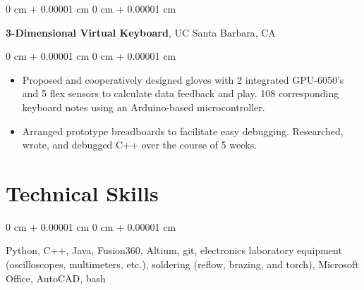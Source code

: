 \documentclass[10pt, letterpaper]{article}
\newenvironment{highlights}{
    \begin{itemize}[
        topsep=0.10 cm,
        parsep=0.10 cm,
        partopsep=0pt,
        itemsep=0pt,
        leftmargin=0 cm + 10pt
    ]
}{
    \end{itemize}
} %
\newenvironment{onecolentry}{
    \begin{adjustwidth}{
        0 cm + 0.00001 cm
    }{
        0 cm + 0.00001 cm
    }
}{
    \end{adjustwidth}
} %
\newenvironment{twocolentry}[2][]{
    \onecolentry
    \def\secondColumn{#2}
    \setcolumnwidth{\fill, 4.5 cm}
    \begin{paracol}{2}
}{
    \switchcolumn \raggedleft \secondColumn
    \end{paracol}
    \endonecolentry
} %
\begin{document}
        
        \begin{twocolentry}{
    
        }
            \textbf{3-Dimensional Virtual Keyboard}, UC Santa Barbara, CA\end{twocolentry}

        \vspace{0.10 cm}
        \begin{onecolentry}
            \begin{highlights}
                \item Proposed and cooperatively designed gloves with 2 integrated GPU-6050's and 5 flex sensors to calculate data feedback and play.
                108 corresponding keyboard notes using an Arduino-based microcontroller.
                \item Arranged prototype breadboards to facilitate easy debugging. Researched, wrote, and debugged C++ over the
                course of 5 weeks.
            \end{highlights}
        \end{onecolentry}
    
    \section{Technical Skills}

        \begin{onecolentry}
            \item Python, C++, Java, Fusion360, Altium, git, electronics laboratory equipment (oscilloscopes, multimeters, etc.), soldering (reflow, brazing, and torch), Microsoft Office, AutoCAD, bash
        \end{onecolentry}
\end{document}
